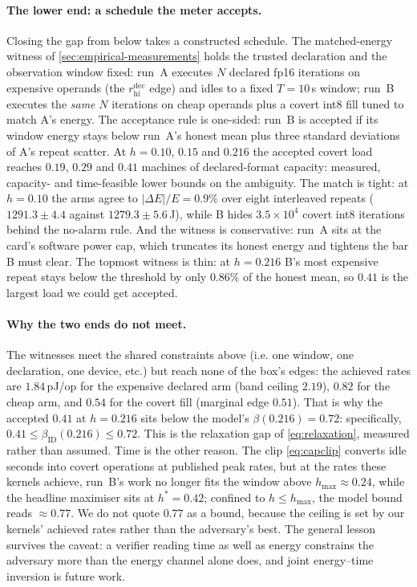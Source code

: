 \documentclass{article}
\theoremstyle{plain}
\theoremstyle{definition}
\theoremstyle{remark}
\begin{document}
\paragraph{The lower end: a schedule the meter accepts.}
Closing the gap from below takes a constructed schedule. The matched-energy
witness of \cref{sec:empirical-measurements} holds the trusted
declaration and the observation window fixed: run~A executes $N$ declared
fp16 iterations on expensive operands (the $r_{\mathrm{hi}}^{\mathrm{dec}}$
edge) and idles to a fixed $T = 10$\,s window; run~B executes the
\emph{same} $N$ iterations on cheap operands plus a covert int8 fill
tuned to match A's energy. The acceptance rule is one-sided: run~B is
accepted if its window energy stays below run~A's honest mean plus three
standard deviations of A's repeat scatter. At $h = 0.10$, $0.15$ and
$0.216$ the accepted covert load reaches $0.19$, $0.29$ and $0.41$
machines of declared-format capacity: measured, capacity- and
time-feasible lower bounds on the ambiguity. The match is tight: at
$h = 0.10$ the arms agree to $|\Delta E|/E = 0.9\%$ over eight
interleaved repeats ($1291.3 \pm 4.4$ against $1279.3 \pm 5.6$\,J), while
B hides $3.5\times 10^{4}$ covert int8 iterations behind the no-alarm
rule. And the witness is conservative: run~A sits at the card's software
power cap, which truncates its honest energy and tightens the bar B must
clear. The topmost witness is thin: at $h = 0.216$ B's most expensive
repeat stays below the threshold by only $0.86\%$ of the honest mean, so
$0.41$ is the largest load we could get accepted.

\paragraph{Why the two ends do not meet.}
The witnesses meet the shared constraints above (i.e. one window, one
declaration, one device, etc.) but reach
none of the box's edges: the achieved rates are $1.84$\,pJ/op for the
expensive declared arm (band ceiling $2.19$), $0.82$ for the cheap arm,
and $0.54$ for the covert fill (marginal edge $0.51$). That is why the
accepted $0.41$ at $h = 0.216$ sits below the model's
$\beta(0.216) = 0.72$: specifically,
$0.41 \leq \beta_{\mathrm{ID}}(0.216) \leq 0.72$. This is the relaxation
gap of \cref{eq:relaxation},
measured rather than assumed. Time is the other reason. The clip
\cref{eq:capclip} converts idle seconds into covert operations at
published peak rates, but at the rates these kernels achieve,
run~B's work no longer fits the window above $h_{\max} \approx 0.24$,
while the headline maximiser sits at $h^{*} = 0.42$; confined to
$h \le h_{\max}$, the model bound reads ${\approx}0.77$. We do not quote
$0.77$ as a bound, because the ceiling is set by our kernels' achieved
rates rather than the adversary's best. The general lesson survives the
caveat: a verifier reading time as well as energy constrains the
adversary more than the energy channel alone does, and joint energy--time
inversion is future work.
\end{document}

